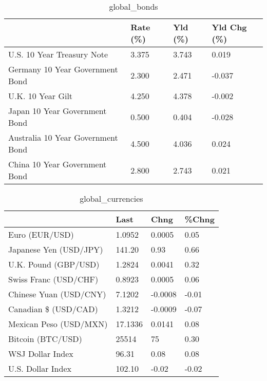 \documentclass{article}%
\begin{document}
%


\begin{table}[htbp]%
\caption{global\_bonds}%
\centering%
\begin{adjustbox}{width=1\textwidth}%
\begin{tabular}{llll}
\toprule
                                  & Rate (\%) & Yld (\%) & Yld Chg (\%) \\
\midrule
       U.S. 10 Year Treasury Note &    3.375 &   3.743 &       0.019 \\
  Germany 10 Year Government Bond &    2.300 &   2.471 &      -0.037 \\
                U.K. 10 Year Gilt &    4.250 &   4.378 &      -0.002 \\
    Japan 10 Year Government Bond &    0.500 &   0.404 &      -0.028 \\
Australia 10 Year Government Bond &    4.500 &   4.036 &       0.024 \\
    China 10 Year Government Bond &    2.800 &   2.743 &       0.021 \\
\bottomrule
\end{tabular}
%
\end{adjustbox}%
\end{table}

%


\begin{table}[htbp]%
\caption{global\_currencies}%
\centering%
\begin{adjustbox}{width=1\textwidth}%
\begin{tabular}{llll}
\toprule
                       &    Last &    Chng & \%Chng \\
\midrule
        Euro (EUR/USD) &  1.0952 &  0.0005 &  0.05 \\
Japanese Yen (USD/JPY) &  141.20 &    0.93 &  0.66 \\
  U.K. Pound (GBP/USD) &  1.2824 &  0.0041 &  0.32 \\
 Swiss Franc (USD/CHF) &  0.8923 &  0.0005 &  0.06 \\
Chinese Yuan (USD/CNY) &  7.1202 & -0.0008 & -0.01 \\
  Canadian \$ (USD/CAD) &  1.3212 & -0.0009 & -0.07 \\
Mexican Peso (USD/MXN) & 17.1336 &  0.0141 &  0.08 \\
     Bitcoin (BTC/USD) &   25514 &      75 &  0.30 \\
      WSJ Dollar Index &   96.31 &    0.08 &  0.08 \\
     U.S. Dollar Index &  102.10 &   -0.02 & -0.02 \\
\bottomrule
\end{tabular}
%
\end{adjustbox}%
\end{table}
\end{document}
